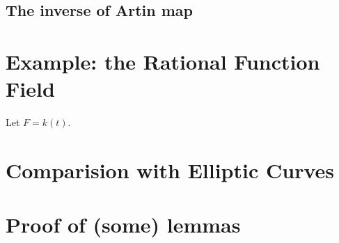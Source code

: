 \documentclass{article}
\begin{document}
\subsection{The inverse of Artin map}



\section{Example: the Rational Function Field}
Let $F = k(t)$.

\section{Comparision with Elliptic Curves}


\section{Proof of (some) lemmas}
\end{document}
